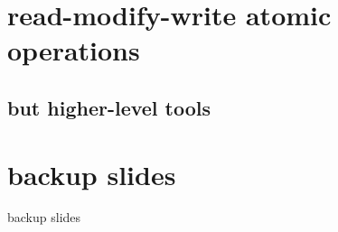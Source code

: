 
\section{read-modify-write atomic operations}


\subsection{but higher-level tools}


\section{backup slides}
\begin{frame}{backup slides}
\end{frame}




